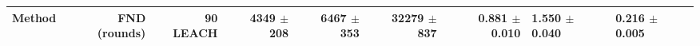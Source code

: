\begin{tabular}{lrrrrrr}
\toprule
Method & FND (rounds) & 90 %
\midrule
LEACH & 4349 $\pm$ 208 & 6467 $\pm$ 353 & 32279 $\pm$ 837 & 0.881 $\pm$ 0.010 & 1.550 $\pm$ 0.040 & 0.216 $\pm$ 0.005 \\
\bottomrule
\end{tabular}